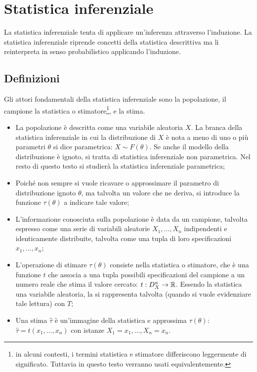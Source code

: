 \section{Statistica inferenziale}
La statistica inferenziale tenta di applicare un'inferenza attraverso l'induzione. La statistica inferenziale riprende concetti della statistica descrittiva ma li reinterpreta in senso probabilistico applicando l'induzione.

\subsection{Definizioni}
Gli attori fondamentali della statistica inferenziale sono la popolazione, il campione la statistica o stimatore\footnote{in alcuni contesti, i termini statistica e stimatore differiscono leggermente di significato. Tuttavia in questo testo verranno usati equivalentemente.}, e la stima.

\begin{itemize}
	\item La popolazione è descritta come una variabile aleatoria $X$. La branca della statistica inferenziale in cui la distribuzione di $X$ è nota a meno di uno o più parametri $\theta$ si dice parametrica: $X\sim F(\theta)$. Se anche il modello della distribuzione è ignoto, si tratta di statistica inferenziale non parametrica. Nel resto di questo testo si studierà la statistica inferenziale parametrica;
	\item Poiché non sempre si vuole ricavare o approssimare il parametro di distribuzione ignoto $\theta$, ma talvolta un valore che ne deriva, si introduce la funzione $\tau(\theta)$ a indicare tale valore;
	\item L'informazione conosciuta sulla popolazione è data da un campione, talvolta espresso come una serie di variabili aleatorie $X_1,\dots,X_n$ indipendenti e identicamente distribuite, talvolta come una tupla di loro specificazioni $x_1,\dots,x_n$;
	\item L'operazione di stimare $\tau(\theta)$ consiste nella statistica o stimatore, che è una funzione $t$ che associa a una tupla possibili specificazioni del campione a un numero reale che stima il valore cercato: $t:D_X^n\to\mathbb R$. Essendo la statistica una variabile aleatoria, la si rappresenta talvolta (quando si vuole evidenziare tale lettura) con $T$;
	\item Una stima $\hat\tau$ è un'immagine della statistica e approssima $\tau(\theta)$: $\hat\tau = t(x_1,\dots,x_n)$ con istanze $X_1=x_1,\dots,X_n=x_n$.
\end{itemize}


